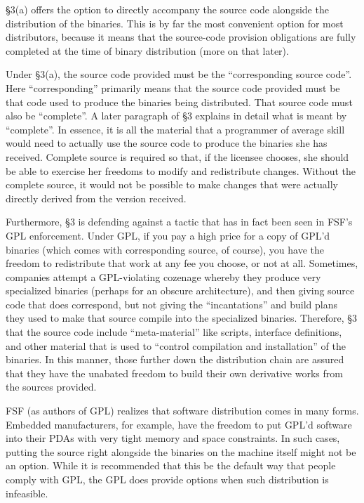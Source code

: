 \documentclass[12pt]{report}
\begin{document}
\S 3(a) offers the option to directly accompany the source code alongside
the distribution of the binaries.  This is by far the most convenient
option for most distributors, because it means that the source-code
provision obligations are fully completed at the time of binary
distribution (more on that later).

Under \S 3(a), the source code provided must be the ``corresponding source
code''.  Here ``corresponding'' primarily means that the source code
provided must be that code used to produce the binaries being distributed.
That source code must also be ``complete''.  A later paragraph of \S 3
explains in detail what is meant by ``complete''.  In essence, it is all
the material that a programmer of average skill would need to actually use
the source code to produce the binaries she has received.  Complete source
is required so that, if the licensee chooses, she should be able to
exercise her freedoms to modify and redistribute changes.  Without the
complete source, it would not be possible to make changes that were
actually directly derived from the version received.

Furthermore, \S 3 is defending against a tactic that has in fact been seen
in FSF's GPL enforcement.  Under GPL, if you pay a high price for a copy
of GPL'd binaries (which comes with corresponding source, of course), you
have the freedom to redistribute that work at any fee you choose, or not
at all.  Sometimes, companies attempt a GPL-violating cozenage whereby
they produce very specialized binaries (perhaps for an obscure
architecture), and then giving source code that does correspond, but not
giving the ``incantations'' and build plans they used to make that source
compile into the specialized binaries.  Therefore, \S 3 that the source
code include ``meta-material'' like scripts, interface definitions, and
other material that is used to ``control compilation and installation'' of
the binaries.  In this manner, those further down the distribution chain
are assured that they have the unabated freedom to build their own
derivative works from the sources provided.

FSF (as authors of GPL) realizes that software distribution comes in many
forms.  Embedded manufacturers, for example, have the freedom to put
GPL'd software into their PDAs with very tight memory and space
constraints.  In such cases, putting the source right alongside the
binaries on the machine itself might not be an option.  While it is
recommended that this be the default way that people comply with GPL, the
GPL does provide options when such distribution is infeasible.
\end{document}
